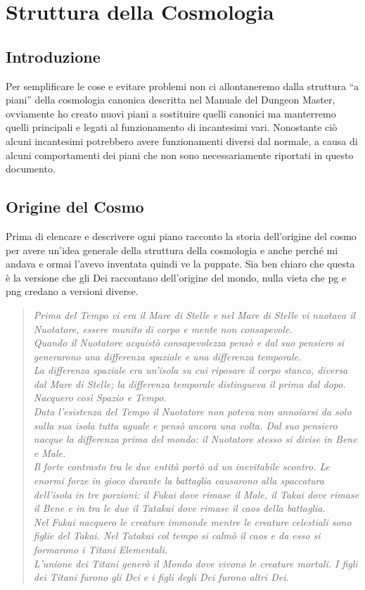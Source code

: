 \documentclass[10pt, a4paper]{report}
\begin{document}
\chapter{Struttura della Cosmologia}
\begin{multicols}{2}
\section{Introduzione}
 Per semplificare le cose e evitare problemi non ci allontaneremo dalla struttura \enquote{a piani} della cosmologia canonica descritta nel Manuale del Dungeon Master, ovviamente ho creato nuovi piani a sostituire quelli canonici ma manterremo quelli principali e legati al funzionamento di incantesimi vari. Nonostante ciò alcuni incantesimi potrebbero avere funzionamenti diversi dal normale, a causa di alcuni comportamenti dei piani che non sono necessariamente riportati in questo documento.
\section{Origine del Cosmo}
Prima di elencare e descrivere ogni piano racconto la storia dell'origine del cosmo per avere un'idea generale della struttura della cosmologia e anche perché mi andava e ormai l'avevo inventata quindi ve la puppate. Sia ben chiaro che questa è la versione che gli Dei raccontano dell'origine del mondo, nulla vieta che pg e png credano a versioni diverse. 
\\
\begin{verse}
\textit{Prima del Tempo vi era il Mare di Stelle e nel Mare di Stelle vi nuotava il Nuotatore, essere munito di corpo e mente non consapevole.\\
Quando il Nuotatore acquistò consapevolezza pensò e dal suo pensiero si generarono una differenza spaziale e una differenza temporale. \\
La differenza spaziale era un'isola su cui riposare il corpo stanco, diversa dal Mare di Stelle; la differenza temporale distingueva il prima dal dopo. Nacquero così Spazio e Tempo. \\
Data l'esistenza del Tempo il Nuotatore non poteva non annoiarsi da solo sulla sua isola tutta uguale e pensò ancora una volta. Dal suo pensiero nacque la differenza prima del mondo: il Nuotatore stesso si divise in Bene e Male. \\
Il forte contrasto tra le due entità portò ad un inevitabile scontro. Le enormi forze in gioco durante la battaglia causarono alla spaccatura dell'isola in tre porzioni: il Fukai dove rimase il Male, il Takai dove rimase il Bene e in tra le due il Tatakai dove rimase il caos della battaglia. \\
Nel Fukai nacquero le creature immonde mentre le creature celestiali sono figlie del Takai.
Nel Tatakai col tempo si calmò il caos e da esso si formarono i Titani Elementali.
\\ L'unione dei Titani generò il Mondo dove vivono le creature mortali. I figli dei Titani furono gli Dei e i figli degli Dei furono altri Dei.}
\end{verse}
\vspace{0.5cm}

\end{multicols}
\end{document}

